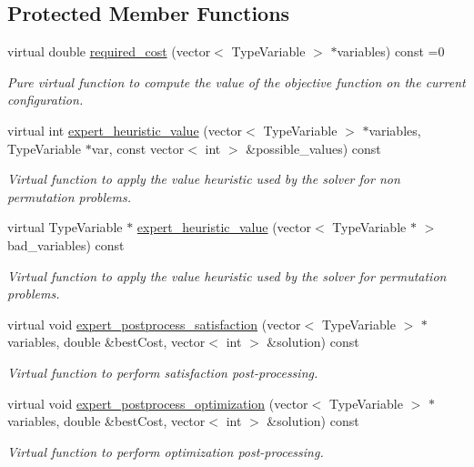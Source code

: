 \subsection*{Protected Member Functions}
\begin{DoxyCompactItemize}
\item 
virtual double \hyperlink{classghost_1_1Objective_ac6baed2eee899efd4c485e5a1e563ee9}{required\+\_\+cost} (vector$<$ Type\+Variable $>$ $\ast$variables) const =0
\begin{DoxyCompactList}\small\item\em Pure virtual function to compute the value of the objective function on the current configuration. \end{DoxyCompactList}\item 
virtual int \hyperlink{classghost_1_1Objective_a98fa914f81c931e804a54303f18bf443}{expert\+\_\+heuristic\+\_\+value} (vector$<$ Type\+Variable $>$ $\ast$variables, Type\+Variable $\ast$var, const vector$<$ int $>$ \&possible\+\_\+values) const 
\begin{DoxyCompactList}\small\item\em Virtual function to apply the value heuristic used by the solver for non permutation problems. \end{DoxyCompactList}\item 
virtual Type\+Variable $\ast$ \hyperlink{classghost_1_1Objective_a204b2d5bc9eaeefd87befaf6302118dc}{expert\+\_\+heuristic\+\_\+value} (vector$<$ Type\+Variable $\ast$ $>$ bad\+\_\+variables) const 
\begin{DoxyCompactList}\small\item\em Virtual function to apply the value heuristic used by the solver for permutation problems. \end{DoxyCompactList}\item 
virtual void \hyperlink{classghost_1_1Objective_a62a46dbc3a64ad27d085e3f0a8863f80}{expert\+\_\+postprocess\+\_\+satisfaction} (vector$<$ Type\+Variable $>$ $\ast$variables, double \&best\+Cost, vector$<$ int $>$ \&solution) const 
\begin{DoxyCompactList}\small\item\em Virtual function to perform satisfaction post-\/processing. \end{DoxyCompactList}\item 
virtual void \hyperlink{classghost_1_1Objective_a6286467c18094e5ddfea4baa445f97ec}{expert\+\_\+postprocess\+\_\+optimization} (vector$<$ Type\+Variable $>$ $\ast$variables, double \&best\+Cost, vector$<$ int $>$ \&solution) const 
\begin{DoxyCompactList}\small\item\em Virtual function to perform optimization post-\/processing. \end{DoxyCompactList}\end{DoxyCompactItemize}
